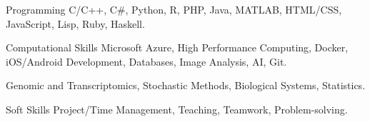 

\begin{cvskills}

  \cvskill
    {Programming} %
    {C/C++, C\#, Python, R, PHP, Java, MATLAB, HTML/CSS, JavaScript,
    Lisp, Ruby, Haskell.} %


    \cvskill
      {Computational Skills} %
      {Microsoft Azure, High Performance Computing, Docker, iOS/Android Development, Databases, Image Analysis,
      AI, Git.} %


    {Genomic and Transcriptomics,
    Stochastic Methods, Biological Systems, Statistics.}



\vspace{0.2cm}
  \cvskill
    {Soft Skills} %
    {Project/Time Management, Teaching, Teamwork,
    Problem-solving.} %

\end{cvskills}
